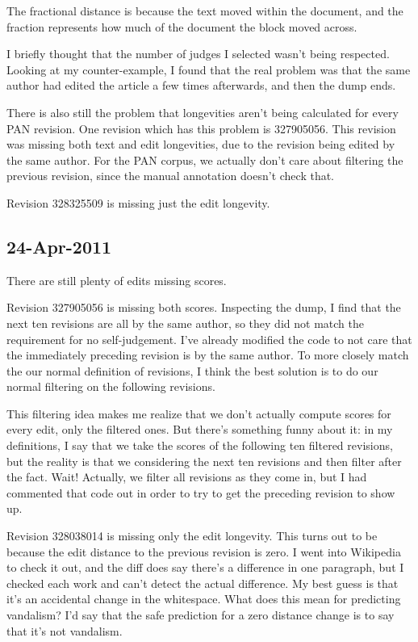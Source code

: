 The fractional distance is because the text moved within
the document, and the fraction represents how much of the
document the block moved across.

I briefly thought that the number of judges I selected
wasn't being respected.
Looking at my counter-example, I found that the real problem was
that the same author had edited the article a few times afterwards,
and then the dump ends.

There is also still the problem that longevities aren't being
calculated for every PAN revision.
One revision which has this problem is 327905056.
This revision was missing both text and edit longevities,
due to the revision being edited by the same author.
For the PAN corpus, we actually don't care about filtering the
previous revision, since the manual annotation doesn't check that.

Revision 328325509 is missing just the edit longevity.

\subsection{24-Apr-2011}

There are still plenty of edits missing scores.

Revision 327905056 is missing both scores.
Inspecting the dump, I find that the next ten revisions are all
by the same author, so they did not match the requirement for
no self-judgement.
I've already modified the code to not care that the immediately
preceding revision is by the same author.
To more closely match the our normal definition of revisions,
I think the best solution is to do our normal filtering on
the following revisions.

This filtering idea makes me realize that we don't actually compute
scores for every edit, only the filtered ones.
But there's something funny about it: in my definitions, I say
that we take the scores of the following ten filtered revisions,
but the reality is that we considering the next ten revisions
and then filter after the fact.
Wait!
Actually, we filter all revisions as they come in, but I had
commented that code out in order to try to get the preceding
revision to show up.


Revision 328038014 is missing only the edit longevity.
This turns out to be because the edit distance to the previous
revision is zero.
I went into Wikipedia to check it out, and the diff does say there's
a difference in one paragraph, but I checked each work and can't
detect the actual difference.
My best guess is that it's an accidental change in the whitespace.
What does this mean for predicting vandalism?
I'd say that the safe prediction for a zero distance change is
to say that it's not vandalism.

